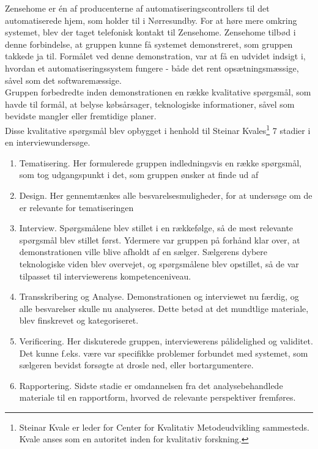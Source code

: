 \label{sec:zensehomeinterview}
Zensehome er én af producenterne af automatiseringscontrollers til det automatiserede hjem, som holder til i Nørresundby. For at høre mere omkring systemet, blev der taget telefonisk kontakt til Zensehome. Zensehome tilbød i denne forbindelse, at gruppen kunne få systemet demonstreret, som gruppen takkede ja til. Formålet ved denne demonstration, var at få en udvidet indsigt i, hvordan et automatiseringssystem fungere - både det rent opsætningsmæssige, såvel som det softwaremæssige. \\

Gruppen forbedredte inden demonstrationen en række kvalitative spørgsmål, som havde til formål, at belyse købsårsager, teknologiske informationer, såvel som bevidste mangler eller fremtidige planer. \\

Disse kvalitative spørgsmål blev opbygget i henhold til Steinar Kvales\cite{BOOK_KVALE}\footnote{Steinar Kvale er leder for Center for Kvalitativ Metodeudvikling sammesteds. Kvale anses som en autoritet inden for kvalitativ forskning.} 7 stadier i en interviewundersøge.
\begin{enumerate}
    \item Tematisering. Her formulerede gruppen indledningsvis en række spørgsmål, som tog udgangspunkt i det, som gruppen ønsker at finde ud af
    \item Design. Her gennemtænkes alle besvarelsesmuligheder, for at undersøge om de er relevante for tematiseringen
    \item Interview. Spørgsmålene blev stillet i en rækkefølge, så de mest relevante spørgsmål blev stillet først. Ydermere var gruppen på forhånd klar over, at demonstrationen ville blive afholdt af en sælger. Sælgerens dybere teknologiske viden blev overvejet, og spørgsmålene blev opstillet, så de var tilpasset til interviewerens kompetenceniveau.
    \item Transskribering og Analyse. Demonstrationen og interviewet nu færdig, og alle besvarelser skulle nu analyseres. Dette betød at det mundtlige materiale, blev finskrevet og kategoriseret.
    \item Verificering. Her diskuterede gruppen, interviewerens pålidelighed og validitet. Det kunne f.eks. være var specifikke problemer forbundet med systemet, som sælgeren bevidst forsøgte at drosle ned, eller bortargumentere.
    \item Rapportering. Sidste stadie er omdannelsen fra det analysebehandlede materiale til en rapportform, hvorved de relevante perspektiver fremføres.
\end{enumerate}

